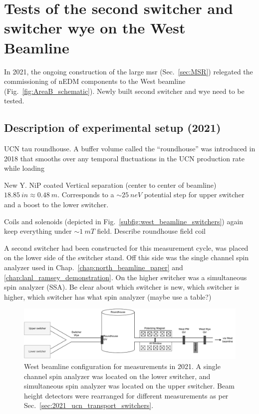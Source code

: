 
\chapter{Tests of the second switcher and switcher wye on the West Beamline}\label{chap:fall2021}


In 2021, the ongoing construction of the large \acrshort{msr} (Sec.~\ref{sec:MSR}) relegated the commissioning of nEDM components to the West beamline (Fig.~\ref{fig:AreaB_schematic}). Newly built second switcher and wye need to be tested.


\section{Description of experimental setup (2021)}


UCN tau roundhouse. A buffer volume called the ``roundhouse'' was introduced in 2018 that  smooths over any temporal fluctuations in the UCN production rate while loading

New Y. NiP coated Vertical separation (center to center of beamline) $\qty{18.85}{in}\approx\qty{0.48}{m}$. Corresponds to a $\sim \qty{25}{neV}$ potential step for upper switcher and a boost to the lower switcher. 

Coils and solenoids (depicted in Fig.~\ref{subfig:west_beamline_switchers}) again keep everything under $\sim \qty{1}{mT}$ field. Describe roundhouse field coil

A second switcher had been constructed for this measurement cycle, was placed on the lower side of the switcher stand. Off this side was the single channel spin analyzer used in Chap.~\ref{chap:north_beamline_paper} and \ref{chap:lanl_ramsey_demonstration}. On the higher switcher was a simultaneous spin analyzer (SSA). Be clear about which switcher is new, which switcher is higher, which switcher has what spin analyzer (maybe use a table?)

\begin{figure}
    \centering
    \includegraphics[width=\textwidth]{figures/westbeamline_2021.pdf}
    \caption[West beamline configuration for measurements in 2021.]
    {West beamline configuration for measurements in 2021. A single channel spin analyzer was located on the lower switcher, and simultaneous spin analyzer was located on the upper switcher. Beam height detectors were rearranged for different measurements as per Sec.~\ref{sec:2021_ucn_transport_switchers}.}\label{fig:west_beamline_2021}
\end{figure}

